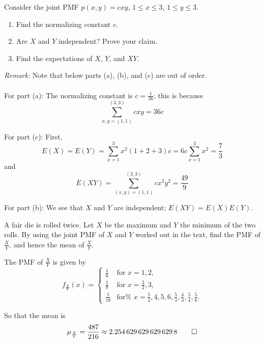 \begin{problem}[Handout 15, \# 11]
  Consider the joint PMF \(p(x,y)=cxy\), \(1\leq x\leq 3\), \(1\leq y\leq
  3\).
  \begin{enumerate}[label=(\alph*),noitemsep]
  \item Find the normalizing constant \(c\).
  \item Are \(X\) and \(Y\) independent? Prove your claim.
  \item Find the expectations of \(X\), \(Y\), and \(XY\).
  \end{enumerate}
\end{problem}
\begin{solution}
  \emph{Remark:} Note that below parts (a), (b), and (c) are out of order.
  \\\\
  For part (a): The normalizing constant is $c=\frac{1}{36}$; this is
  because
  \[
    \sum_{x,y =(1,1)}^{(3,3)} cxy = 36c
  \]

  For part (c): First,
  \[
    E(X) = E(Y) = \sum_{x=1}^3 x^2(1+2+3)c = 6c \sum_{x=1}^3
    x^2 = \frac{7}{3}
  \]
  and
  \[
    E(XY) = \sum_{(x,y) = (1,1)}^{(3,3)} cx^2y^2 =\frac{49}{9}
  \]

  For part (b): We see that $X$ and $Y$ are independent;
  $E(XY) = E(X)E(Y)$.
\end{solution}

\begin{problem}[Handout 15, \# 12]
  A fair die is rolled twice. Let \(X\) be the maximum and \(Y\) the
  minimum of the two rolls. By using the joint PMF of \(X\) and \(Y\)
  worked out in the text, find the PMF of \(\frac{X}{Y}\), and hence the
  mean of \(\frac{X}{Y}\).
\end{problem}
\begin{solution}
  The PMF of $\frac{X}{Y}$ is given by
  \[
    f_{\frac{X}{Y}}(x)=
    \begin{cases}
      \frac{1}{6}&\text{for \(x=1,2\),} \\
      \frac{1}{9}&\text{for \(x=\frac{3}{2},3\),} \\
      \frac{1}{18}&\text{for%
        \(x=\frac{5}{2},%
        4,5,6,\frac{5}{3},%
        \frac{4}{3},\frac{5}{4},%
        \frac{5}{6}\).}
    \end{cases}
  \]

  So that the mean is
  \[
    \mu_{\frac{X}{Y}} = \frac{487}{216} \approx\num{2.2546296296296298}\qedhere
  \]
\end{solution}

